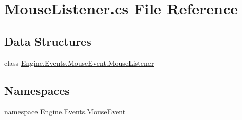 \hypertarget{a00068}{}\section{Mouse\+Listener.\+cs File Reference}
\label{a00068}
\subsection*{Data Structures}
\begin{DoxyCompactItemize}
\item 
class \hyperlink{a00382}{Engine.\+Events.\+Mouse\+Event.\+Mouse\+Listener}
\end{DoxyCompactItemize}
\subsection*{Namespaces}
\begin{DoxyCompactItemize}
\item 
namespace \hyperlink{a00248}{Engine.\+Events.\+Mouse\+Event}
\end{DoxyCompactItemize}
